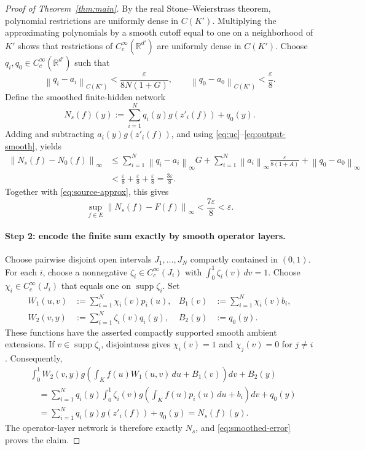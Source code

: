 \documentclass[11pt]{article}
\newcommand{\R}{\mathbb{R}}
\newcommand{\supp}{\operatorname{supp}}
\newcommand{\norm}[1]{\left\lVert #1\right\rVert}
\begin{document}
\begin{proof}[Proof of Theorem~\ref{thm:main}]
By the real Stone--Weierstrass theorem, polynomial restrictions are uniformly
dense in $C(K')$.  Multiplying the approximating polynomials by a smooth
cutoff equal to one on a neighborhood of $K'$ shows that restrictions of
$C_c^\infty(\R^{d'})$ are uniformly dense in $C(K')$.  Choose
$q_i,q_0\in C_c^\infty(\R^{d'})$ such that
\begin{equation}\label{eq:output-smooth}
 \norm{q_i-a_i}_{C(K')}<\frac{\varepsilon}{8N(1+G)},
 \qquad
 \norm{q_0-a_0}_{C(K')}<\frac{\varepsilon}{8}.
\end{equation}
Define the smoothed finite-hidden network
\[
 N_s(f)(y):=\sum_{i=1}^Nq_i(y)g(z'_i(f))+q_0(y).
\]
Adding and subtracting $a_i(y)g(z'_i(f))$, and using
\eqref{eq:uc}--\eqref{eq:output-smooth}, yields
\begin{align*}
 \norm{N_s(f)-N_0(f)}_\infty
 &\leq \sum_{i=1}^N\norm{q_i-a_i}_\infty G
  +\sum_{i=1}^N\norm{a_i}_\infty
      \frac{\varepsilon}{8(1+A)}
  +\norm{q_0-a_0}_\infty \\
 &<\frac{\varepsilon}{8}+\frac{\varepsilon}{8}
   +\frac{\varepsilon}{8}
 =\frac{3\varepsilon}{8}.
\end{align*}
Together with \eqref{eq:source-approx}, this gives
\begin{equation}\label{eq:smoothed-error}
 \sup_{f\in E}\norm{N_s(f)-F(f)}_\infty
 <\frac{7\varepsilon}{8}<\varepsilon.
\end{equation}

\paragraph{Step 2: encode the finite sum exactly by smooth operator layers.}
Choose pairwise disjoint open intervals $J_1,\dots,J_N$ compactly contained
in $(0,1)$.  For each $i$, choose a nonnegative
$\zeta_i\in C_c^\infty(J_i)$ with
$\int_0^1\zeta_i(v)\,dv=1$.  Choose
$\chi_i\in C_c^\infty(J_i)$ that equals one on $\supp\zeta_i$.  Set
\begin{align*}
 W_1(u,v)&:=\sum_{i=1}^N\chi_i(v)p_i(u),
 &B_1(v)&:=\sum_{i=1}^N\chi_i(v)b_i,\\
 W_2(v,y)&:=\sum_{i=1}^N\zeta_i(v)q_i(y),
 &B_2(y)&:=q_0(y).
\end{align*}
These functions have the asserted compactly supported smooth ambient
extensions.  If $v\in\supp\zeta_i$, disjointness gives
$\chi_i(v)=1$ and $\chi_j(v)=0$ for $j\neq i$.  Consequently,
\begin{align*}
 &\int_0^1 W_2(v,y)
 g\!\left(\int_K f(u)W_1(u,v)\,du+B_1(v)\right)dv+B_2(y)\\
 &\quad=\sum_{i=1}^Nq_i(y)
    \int_0^1\zeta_i(v)g\!\left(\int_Kf(u)p_i(u)\,du+b_i\right)dv+q_0(y)\\
 &\quad=\sum_{i=1}^Nq_i(y)g(z'_i(f))+q_0(y)
 =N_s(f)(y).
\end{align*}
The operator-layer network is therefore exactly $N_s$, and
\eqref{eq:smoothed-error} proves the claim.
\end{proof}
\end{document}
